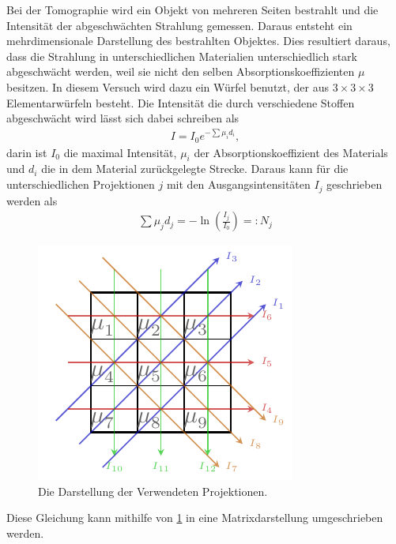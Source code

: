 Bei der Tomographie wird ein Objekt von mehreren Seiten bestrahlt und die Intensität der abgeschwächten Strahlung gemessen.
Daraus entsteht ein mehrdimensionale Darstellung des bestrahlten Objektes.
Dies resultiert daraus, dass die Strahlung in unterschiedlichen Materialien unterschiedlich stark abgeschwächt werden, weil sie nicht den selben Absorptionskoeffizienten $\mu$ besitzen.
\FloatBarrier
In diesem Versuch wird dazu ein Würfel benutzt, der aus $3\times3\times3$ Elementarwürfeln besteht.
Die Intensität die durch verschiedene Stoffen abgeschwächt wird lässt sich dabei schreiben als
\begin{align}
	I = I_0e^{-\sum \mu_i d_i},
\end{align}
darin ist $I_0$ die maximal Intensität, $\mu_i$ der Absorptionskoeffizient des Materials und $d_i$ die in dem Material zurückgelegte Strecke. 
Daraus kann für die unterschiedlichen Projektionen $j$ mit den Ausgangsintensitäten $I_j$ geschrieben werden als
\begin{align}
	\sum \mu_j d_j = -\ln\left(\frac{I_j}{I_0}\right)=:N_j
\end{align}


\begin{figure}[h]
	\centering
	\includegraphics[scale=1.75]{../Grafiken/Tikz/tikz-Projektionen.pdf}
	\caption{Die Darstellung der Verwendeten Projektionen.\label{fig:Projektion}}
\end{figure}
\FloatBarrier

Diese Gleichung kann mithilfe von \cref{fig:Projektion} in eine Matrixdarstellung umgeschrieben werden.

